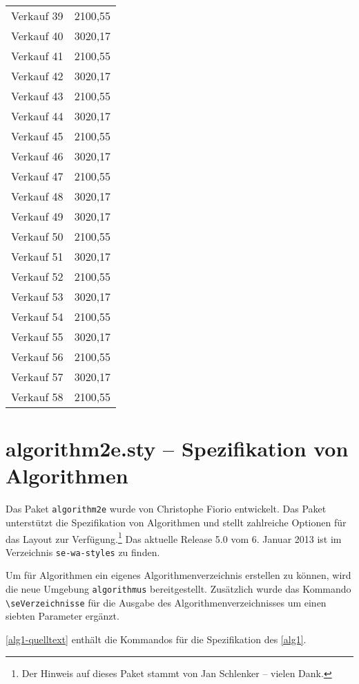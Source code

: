 \begin{center}
\begin{supertabular}{ | l | r |}
Verkauf 39 & 2100,55 \\
Verkauf 40 & 3020,17 \\
Verkauf 41 & 2100,55 \\
Verkauf 42 & 3020,17 \\
Verkauf 43 & 2100,55 \\
Verkauf 44 & 3020,17 \\
Verkauf 45 & 2100,55 \\
Verkauf 46 & 3020,17 \\
Verkauf 47 & 2100,55 \\
Verkauf 48 & 3020,17 \\
Verkauf 49 & 3020,17 \\
Verkauf 50 & 2100,55 \\
Verkauf 51 & 3020,17 \\
Verkauf 52 & 2100,55 \\
Verkauf 53 & 3020,17 \\
Verkauf 54 & 2100,55 \\
Verkauf 55 & 3020,17 \\
Verkauf 56 & 2100,55 \\
Verkauf 57 & 3020,17 \\
Verkauf 58 & 2100,55 \\
\end{supertabular}
\end{center}


\section{algorithm2e.sty -- Spezifikation von Algorithmen}

Das Paket \texttt{algorithm2e} wurde von Christophe Fiorio entwickelt.
Das Paket unterst\"utzt die Spezifikation von Algorithmen und stellt zahlreiche Optionen 
f\"ur das Layout zur Verf\"ugung.\footnote{Der Hinweis auf dieses Paket stammt von Jan Schlenker -- vielen Dank.}
Das aktuelle Release 5.0 vom 6. Januar 2013 ist im Verzeichnis \verb+se-wa-styles+ zu finden.

Um f\"ur Algorithmen ein eigenes Algorithmenverzeichnis erstellen zu k\"onnen, wird die neue Umgebung \verb+algorithmus+ 
bereitgestellt. Zus\"atzlich wurde das Kommando \verb+\seVerzeichnisse+ f\"ur die Ausgabe des Algorithmenverzeichnisses 
um einen siebten Parameter erg\"anzt.

\vref*{alg1-quelltext} enth\"alt die Kommandos f\"ur die Spezifikation des \vref{alg1}.

